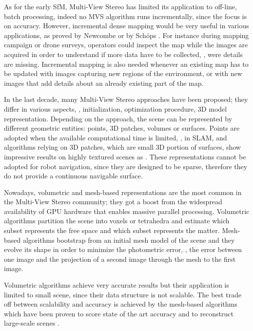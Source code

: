 As for the early SfM,  Multi-View Stereo has limited its application to off-line, batch processing, indeed no MVS algorithm runs incrementally, since the focus is on accuracy.
However, incremental dense mapping would be very useful in various applications, as proved by Newcombe \etal \cite{newcombe2011dtam} or by Sch{\"o}ps \etal \cite{schops20153d}. 
For instance during mapping campaign or drone surveys, operators could inspect the map while the images are  acquired in order to understand if more data have to be collected, \eg, were details are missing. 
Incremental mapping is also needed whenever an existing map has to be updated with images capturing new regions of the environment, or with new images that add details about an already existing part of the map.


In the last decade, many Multi-View Stereo approaches have been proposed; they differ in various aspects, \eg, initialization, optimization procedure, 3D model representation.
Depending on the approach, the scene can be represented by different geometric entities: points, 3D patches, volumes or surfaces.
Points are adopted when the available computational time is limited, \eg, in SLAM, and algorithms relying on 3D patches, which are small 3D portion of surfaces,  show impressive results on highly textured scenes as \cite{furukawa2009reconstructing}. 
These representations cannot be adopted for robot navigation, since they are designed to be sparse, therefore they do not provide a continuous navigable surface.

Nowadays, volumetric and mesh-based representations are the most common in the Multi-View Stereo community; they got a boost from the widespread availability of GPU hardware that enables massive parallel processing.
Volumetric algorithms partition the scene into voxels or tetrahedra and estimate which subset represents the free space and which subset represents the matter.
Mesh-based algorithms bootstrap from an initial mesh model of the scene and they evolve its shape in order to minimize the photometric error, \ie, the error between one image and the projection of a second image through the mesh to the first image.

Volumetric algorithms achieve very accurate results but their application is limited to small scene, since their data structure is not scalable. 
The best trade off between scalability and accuracy is achieved by the mesh-based algorithms which have been proven to score state of the art accuracy \cite{li2015detail} and to reconstruct large-scale scenes \cite{vu_et_al_2012}.


